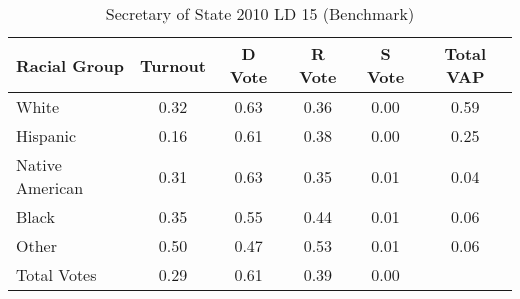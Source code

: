 \begin{table}[htb]
\begin{center}
\caption{Secretary of State 2010 LD 15 (Benchmark)}
\label{sos10_vap_ld_15_benchmark}
\begin{tabular}{lccccc}
  \hline
Racial Group & Turnout & D Vote & R Vote & S Vote & Total VAP \\ 
  \hline
White & 0.32 & 0.63 & 0.36 & 0.00 & 0.59 \\ 
  Hispanic & 0.16 & 0.61 & 0.38 & 0.00 & 0.25 \\ 
  Native American & 0.31 & 0.63 & 0.35 & 0.01 & 0.04 \\ 
  Black & 0.35 & 0.55 & 0.44 & 0.01 & 0.06 \\ 
  Other & 0.50 & 0.47 & 0.53 & 0.01 & 0.06 \\ 
  Total Votes & 0.29 & 0.61 & 0.39 & 0.00 &  \\ 
   \hline
\end{tabular}
\end{center}
\end{table}
